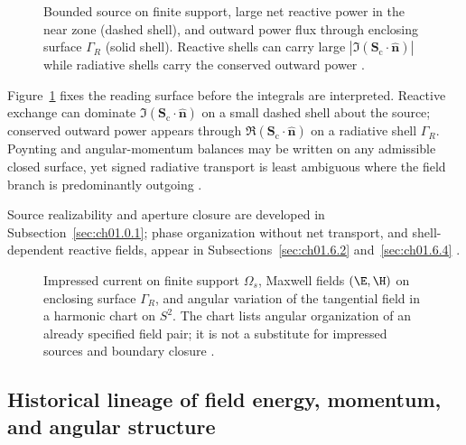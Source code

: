 \begin{figure}[t]
\centering
\VolIPhysFig{\VolIPhysReactiveVsRadiative}
\caption{Bounded source on finite support, large net reactive power in the near zone (dashed shell), and outward power flux through enclosing surface $\Gamma_R$ (solid shell). Reactive shells can carry large $|\Im(\mathbf{S}_\mathrm{c}\cdot\hat{\mathbf{n}})|$ while radiative shells carry the conserved outward power \cite{poynting1884,chu1948}.}
\label{fig:ch1.master-philosophy}
\end{figure}

Figure~\ref{fig:ch1.master-philosophy} fixes the reading surface before the integrals are interpreted. Reactive exchange can dominate $\Im(\mathbf{S}_\mathrm{c}\cdot\hat{\mathbf{n}})$ on a small dashed shell about the source; conserved outward power appears through $\Re(\mathbf{S}_\mathrm{c}\cdot\hat{\mathbf{n}})$ on a radiative shell $\Gamma_R$. Poynting and angular-momentum balances may be written on any admissible closed surface, yet signed radiative transport is least ambiguous where the field branch is predominantly outgoing \cite{chu1948,stratton1941}.

Source realizability and aperture closure are developed in Subsection~\ref{sec:ch01.0.1}; phase organization without net transport, and shell-dependent reactive fields, appear in Subsections~\ref{sec:ch01.6.2} and~\ref{sec:ch01.6.4} \cite{stratton1941,harrington2001}.
\label{thm:ch1.realizability-hierarchy}\label{prin:ch1.rep-physics}\label{def:ch1.hierarchy-classes}\label{hier:ch1.angular-status}\label{prin:ch1.finite-geometry-angular}\label{prin:ch1.accessibility}

\begin{figure}[t]
\centering
\VolIPhysFig{\VolIPhysThreeLevelHierarchy}
\caption{Impressed current on finite support $\Omega_s$, Maxwell fields $(\E,\H)$ on enclosing surface $\Gamma_R$, and angular variation of the tangential field in a harmonic chart on $S^2$. The chart lists angular organization of an already specified field pair; it is not a substitute for impressed sources and boundary closure \cite{stratton1941}.}
\label{fig:ch1.three-level-hierarchy}
\end{figure}

\subsection{Historical lineage of field energy, momentum, and angular structure}
\label{sec:ch01.0.historical-lineage}

